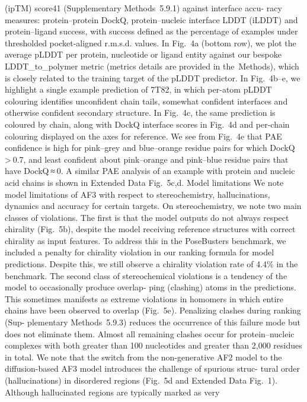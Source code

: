 (ipTM) score41 (Supplementary Methods 5.9.1) against interface accu-
racy measures: protein–protein DockQ, protein–nucleic interface
LDDT (iLDDT) and protein–ligand success, with success defined as the
percentage of examples under thresholded pocket-aligned r.m.s.d.
values. In Fig. 4a (bottom row), we plot the average pLDDT per protein,
nucleotide or ligand entity against our bespoke LDDT\_to\_polymer
metric (metrics details are provided in the Methods), which is closely
related to the training target of the pLDDT predictor.
In Fig. 4b–e, we highlight a single example prediction of 7T82, in
which per-atom pLDDT colouring identifies unconfident chain tails,
somewhat confident interfaces and otherwise confident secondary
structure. In Fig. 4c, the same prediction is coloured by chain, along with
DockQ interface scores in Fig. 4d and per-chain colouring displayed on
the axes for reference. We see from Fig. 4e that PAE confidence is high
for pink–grey and blue–orange residue pairs for which DockQ > 0.7,
and least confident about pink–orange and pink–blue residue pairs
that have DockQ ≈ 0. A similar PAE analysis of an example with protein
and nucleic acid chains is shown in Extended Data Fig. 5c,d.
Model limitations
We note model limitations of AF3 with respect to stereochemistry,
hallucinations, dynamics and accuracy for certain targets.
On stereochemistry, we note two main classes of violations. The
first is that the model outputs do not always respect chirality (Fig. 5b),
despite the model receiving reference structures with correct chirality
as input features. To address this in the PoseBusters benchmark, we
included a penalty for chirality violation in our ranking formula for
model predictions. Despite this, we still observe a chirality violation
rate of 4.4\% in the benchmark. The second class of stereochemical
violations is a tendency of the model to occasionally produce overlap-
ping (clashing) atoms in the predictions. This sometimes manifests
as extreme violations in homomers in which entire chains have been
observed to overlap (Fig. 5e). Penalizing clashes during ranking (Sup-
plementary Methods 5.9.3) reduces the occurrence of this failure mode
but does not eliminate them. Almost all remaining clashes occur for
protein–nucleic complexes with both greater than 100 nucleotides
and greater than 2,000 residues in total.
We note that the switch from the non-generative AF2 model to the
diffusion-based AF3 model introduces the challenge of spurious struc-
tural order (hallucinations) in disordered regions (Fig. 5d and Extended
Data Fig. 1). Although hallucinated regions are typically marked as very
